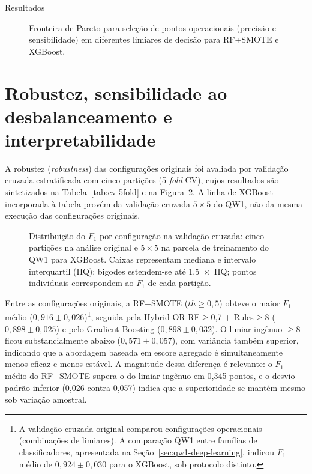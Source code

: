 \begin{chapter}{Resultados}
\begin{figure}[!ht]
\centering

\caption{Fronteira de Pareto para seleção de pontos operacionais (precisão e sensibilidade) em diferentes limiares de decisão para RF+SMOTE e XGBoost.}
\label{fig:pareto-frontier}
\end{figure}

\sloppy
\section{Robustez, sensibilidade ao desbalanceamento e interpretabilidade}
\fussy
\label{sec:cap5-robustez-interpretabilidade}
\begin{sloppypar}
A robustez (\textit{robustness}) das configurações originais foi avaliada por validação cruzada estratificada com cinco partições (5-\textit{fold} CV), cujos resultados são sintetizados na Tabela~\ref{tab:cv-5fold} e na Figura~\ref{fig:cv-boxplots}. A linha de XGBoost incorporada à tabela provém da validação cruzada $5 \times 5$ do QW1, não da mesma execução das configurações originais.



\begin{figure}[!ht]
\centering
\resizebox{0.96\textwidth}{!}{}
\caption{Distribuição do $F_1$ por configuração na validação cruzada: cinco partições na análise original e $5 \times 5$ na parcela de treinamento do QW1 para XGBoost. Caixas representam mediana e intervalo interquartil (IIQ); bigodes estendem-se até 1{,}5~$\times$~IIQ; pontos individuais correspondem ao $F_1$ de cada partição.}
\label{fig:cv-boxplots}
\end{figure}

Entre as configurações originais, a RF+SMOTE ($th \geq 0{,}5$) obteve o maior $F_1$ médio ($0{,}916 \pm 0{,}026$)\footnote{A validação cruzada original comparou configurações operacionais (combinações de limiares). A comparação QW1 entre famílias de classificadores, apresentada na Seção~\ref{sec:qw1-deep-learning}, indicou $F_1$ médio de $0{,}924 \pm 0{,}030$ para o XGBoost, sob protocolo distinto.}, seguida pela Hybrid-OR RF$\geq$0,7 + Rules$\geq$8 ($0{,}898 \pm 0{,}025$) e pelo Gradient Boosting ($0{,}898 \pm 0{,}032$). O limiar ingênuo $\geq 8$ ficou substancialmente abaixo ($0{,}571 \pm 0{,}057$), com variância também superior, indicando que a abordagem baseada em escore agregado é simultaneamente menos eficaz e menos estável. A magnitude dessa diferença é relevante: o $F_1$ médio do RF+SMOTE supera o do limiar ingênuo em 0,345 pontos, e o desvio-padrão inferior (0,026 contra 0,057) indica que a superioridade se mantém mesmo sob variação amostral.
\end{sloppypar}


\end{chapter}
